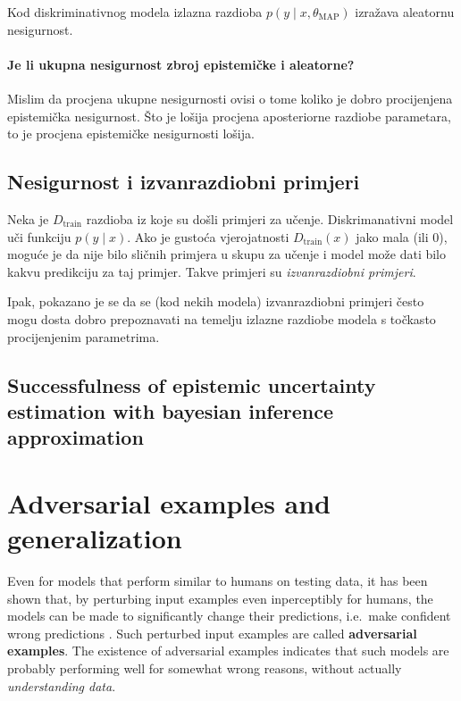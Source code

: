 \documentclass{article}
\begin{document}
Kod diskriminativnog modela izlazna razdioba $p(y\mid x, \theta_\text{MAP})$ izražava aleatornu nesigurnost.

\paragraph{Je li ukupna nesigurnost zbroj epistemičke i aleatorne?}
Mislim da procjena ukupne nesigurnosti ovisi o tome koliko je dobro procijenjena epistemička nesigurnost. Što je lošija procjena aposteriorne razdiobe parametara, to je procjena epistemičke nesigurnosti lošija.


\subsection{Nesigurnost i izvanrazdiobni primjeri}

Neka je $D_{\text{train}}$ razdioba iz koje su došli primjeri za učenje. Diskrimanativni model uči funkciju $p(y\mid x)$. Ako je gustoća vjerojatnosti $D_{\text{train}}(x)$ jako mala (ili $0$), moguće je da nije bilo sličnih primjera u skupu za učenje i model može dati bilo kakvu predikciju za taj primjer. Takve primjeri su \emph{izvanrazdiobni primjeri}.

Ipak, pokazano je se da se (kod nekih modela) izvanrazdiobni primjeri često mogu dosta dobro prepoznavati na temelju izlazne razdiobe modela s točkasto procijenjenim parametrima. 


\subsection{Successfulness of epistemic uncertainty estimation with bayesian inference approximation}



\section{Adversarial examples and generalization}

Even for models that perform similar to humans on testing data, it has been shown that, by perturbing input examples even inperceptibly for humans, the models can be made to significantly change their predictions, i.e.\ make confident wrong predictions \citep{Szegedy:2013:IPNN, Goodfellow:2014:EHAE}. Such perturbed input examples are called \textbf{adversarial examples}. The existence of adversarial examples indicates that such models are probably performing well for somewhat wrong reasons, without actually \textit{understanding data}.
\end{document}
